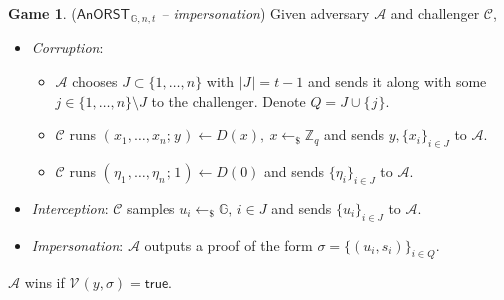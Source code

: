 \documentclass[psamsfonts, reqno]{amsart}
\theoremstyle{definition}
\newtheorem{attack_game}[thm]{Game}
\theoremstyle{remark}
\numberwithin{equation}{section}
\begin{document}
\begin{attack_game}\label{anorst_attack_impersonation}
\vspace{5pt}
(\textit{\textup{$\mathsf{AnORST}_{\hspace{1pt}\mathbb{G}, n, t}$}
-- impersonation})
Given adversary $\mathcal{A}$ and challenger $\mathcal{C}$,
\begin{itemize}[label=$\bullet$,leftmargin=20pt]
	\vspace{3pt}
	\item
		\textit{Corruption}:
			\begin{itemize}[
				label=$\circ$,leftmargin=17pt,rightmargin=21pt
			]
			\vspace{3pt}
			\item $\mathcal{A}$ chooses $J \subset \{1, \dots, n\}$
				with $|J\hspace{1pt}| = t - 1$
				and sends it along with some
				$j \in \{1, \dots, n\} \setminus J$
				to the challenger.
				Denote $Q = J \cup \{\hspace{1pt}j\hspace{1pt}\}$.
				\vspace{3pt}
			\item $\mathcal{C}$ runs
				$(\hspace{1pt}x_1, \dots, x_n;\hspace{1pt} y\hspace{1pt})
				\leftarrow D(x), \ x \leftarrow_\$ \mathbb{Z}_q$
				and sends $y, \{x_i\}_{i \in J}$
				to $\mathcal{A}$.
				\vspace{3pt}
			\item $\mathcal{C}$ runs
				$(\hspace{1pt}\eta_1\hspace{1pt}, \dots, 	
				\eta_n\hspace{1pt};\hspace{1pt} 1\hspace{1pt})
				\leftarrow D(0)$
				and sends $\{\eta_i\}_{i \in J}$
				to $\mathcal{A}$.
				\vspace{3pt}
		\vspace{5pt}
	\end{itemize}
	\item
		\textit{Interception}:
		$\mathcal{C}$ samples
		$u_i \leftarrow_\$ \mathbb{G},\hspace{2pt} i \in J$
		and sends $\{u_i\}_{i \in J}$
		to $\mathcal{A}$.\vspace{3pt}
	\item \textit{Impersonation}:
		$\mathcal{A}$ outputs a proof of the form
		$\sigma = \{(u_i, s_i)\}_{i \in Q}$.
\end{itemize}
\hspace*{5pt}%
\begin{minipage}{\dimexpr\textwidth-\parindent\relax}%
\vspace{7pt}
\hspace{3pt}
$\mathcal{A}$ wins if
$\mathcal{V}\hspace{1pt}(y, \sigma) = \textsf{true}$.
\end{minipage}%
\vspace{5pt}
\end{attack_game}
\end{document}
